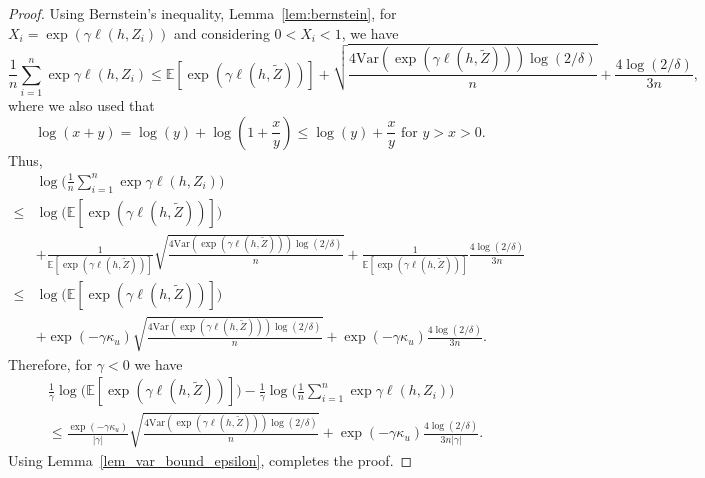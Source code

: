 \documentclass{article}
\theoremstyle{plain}
\theoremstyle{plain}
\theoremstyle{definition}
\theoremstyle{remark}
\newcommand{\var}{\mathrm{Var}}
\newcommand{\mbE}{\mathbb{E}}
\begin{document}
\begin{proof}
Using Bernstein's inequality, Lemma~\ref{lem:bernstein}, for $X_i=\exp(\gamma\ell(h,Z_i))$ and considering $0<X_i<1$, we have 
\[
\frac{1}{n}\sum_{i=1}^n \exp{\gamma \ell(h,Z_i)}\leq \mbE[\exp(\gamma \ell(h,\tilde Z))]+ \sqrt{\frac{4\var(\exp(\gamma \ell(h,\tilde Z)))\log(2/\delta)}{n}}+\frac{4\log(2/\delta)}{3n}, 
\]
where we also used that 
\begin{equation} 
\log(x+y)=\log(y)+\log(1+\frac{x}{y})\leq \log(y)+\frac{x}{y} \mbox{ for } y > x > 0. \label{eq:usefulfact}
\end{equation} Thus,
\[
\begin{split}
&\log\Big(\frac{1}{n}\sum_{i=1}^n \exp{\gamma \ell(h,Z_i)}\Big)\\
\leq &  \log\Big(\mbE[\exp(\gamma \ell(h,\tilde Z))]\Big)\\&+ \frac{1}{\mbE[\exp(\gamma \ell(h,\tilde Z))]} \sqrt{\frac{4\var(\exp(\gamma \ell(h,\tilde Z)))\log(2/\delta)}{n}}+\frac{1}{\mbE[\exp(\gamma \ell(h,\tilde Z))]}\frac{4\log(2/\delta)}{3n}\\
\leq & \log\Big(\mbE[\exp(\gamma \ell(h,\tilde Z))]\Big)\\&+ \exp(-\gamma \kappa_u) \sqrt{\frac{4\var(\exp(\gamma \ell(h,\tilde Z)))\log(2/\delta)}{n}}+\exp(-\gamma \kappa_u)\frac{4\log(2/\delta)}{3n}.
\end{split}
\]
Therefore, for $\gamma<0$ we have 
\[
\begin{split}
&\frac{1}{\gamma}\log\Big(\mbE[\exp(\gamma \ell(h,\tilde Z))]\Big)-\frac{1}{\gamma}\log\Big(\frac{1}{n}\sum_{i=1}^n \exp{\gamma \ell(h,Z_i)}\Big)\\
&\leq \frac{\exp(-\gamma \kappa_u)}{|\gamma|} \sqrt{\frac{4\var(\exp(\gamma \ell(h,\tilde Z)))\log(2/\delta)}{n}}+\exp(-\gamma \kappa_u)\frac{4\log(2/\delta)}{3n|\gamma|}.
\end{split}
\]
Using Lemma~\ref{lem_var_bound_epsilon}, completes the proof.
\end{proof}
\end{document}
